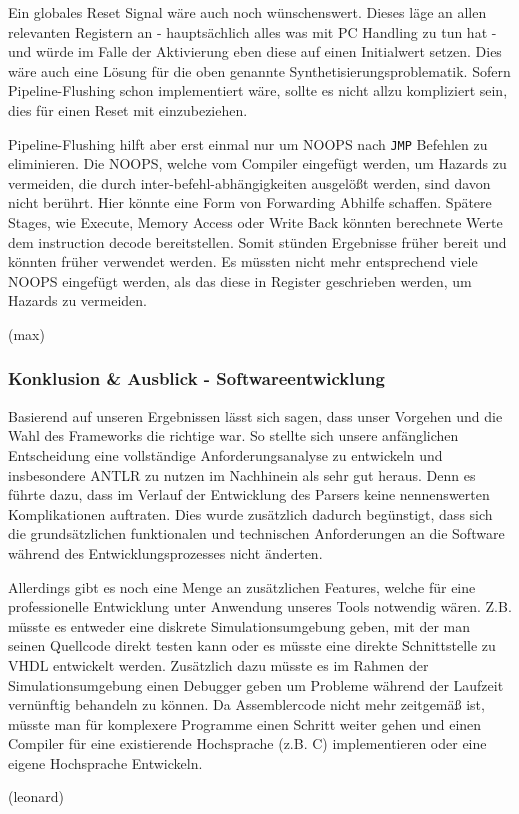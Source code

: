 \documentclass[paper=a4,fontsize=12pt,twocolumn]{scrreprt}
\begin{document}
Ein globales Reset Signal wäre auch noch wünschenswert.
Dieses läge an allen relevanten Registern an - hauptsächlich alles was mit PC Handling zu tun hat - und würde im Falle der Aktivierung eben diese auf einen Initialwert setzen.
Dies wäre auch eine Lösung für die oben genannte Synthetisierungsproblematik.
Sofern Pipeline-Flushing schon implementiert wäre, sollte es nicht allzu kompliziert sein, dies für einen Reset mit einzubeziehen.

Pipeline-Flushing hilft aber erst einmal nur um NOOPS nach \texttt{JMP} Befehlen zu eliminieren.
Die NOOPS, welche vom Compiler eingefügt werden, um Hazards zu vermeiden, die durch inter-befehl-abhängigkeiten ausgelößt werden, sind davon nicht berührt.
Hier könnte eine Form von Forwarding Abhilfe schaffen.
Spätere Stages, wie Execute, Memory Access oder Write Back könnten berechnete Werte dem instruction decode bereitstellen.
Somit stünden Ergebnisse früher bereit und könnten früher verwendet werden.
Es müssten nicht mehr entsprechend viele NOOPS eingefügt werden, als das diese in Register geschrieben werden, um Hazards zu vermeiden.

(max)

\subsubsection{Konklusion \& Ausblick - Softwareentwicklung}
Basierend auf unseren Ergebnissen lässt sich sagen, dass unser Vorgehen und die Wahl des Frameworks die richtige war.
So stellte sich unsere anfänglichen Entscheidung eine vollständige Anforderungsanalyse zu entwickeln und insbesondere ANTLR zu nutzen im Nachhinein als sehr gut heraus.
Denn es führte dazu, dass im Verlauf der Entwicklung des Parsers keine nennenswerten Komplikationen auftraten.
Dies wurde zusätzlich dadurch begünstigt, dass sich die grundsätzlichen funktionalen und technischen Anforderungen an die Software während des Entwicklungsprozesses nicht änderten.

Allerdings gibt es noch eine Menge an zusätzlichen Features, welche für eine professionelle Entwicklung unter Anwendung unseres Tools notwendig wären.
Z.B. müsste es entweder eine diskrete Simulationsumgebung geben, mit der man seinen Quellcode direkt testen kann oder es müsste eine direkte Schnittstelle zu VHDL
entwickelt werden.
Zusätzlich dazu müsste es im Rahmen der Simulationsumgebung einen Debugger geben um Probleme während der Laufzeit vernünftig behandeln zu können.
Da Assemblercode nicht mehr zeitgemäß ist, müsste man für komplexere Programme einen Schritt weiter gehen und einen Compiler für eine existierende Hochsprache (z.B. C) implementieren oder eine eigene Hochsprache Entwickeln.

(leonard)


\end{document}
